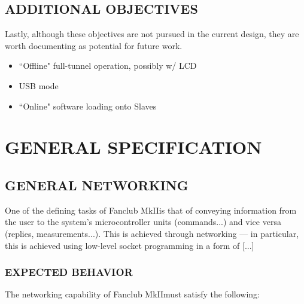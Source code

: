 \documentclass{article}
\newcommand{\Fc}{Fanclub MkII}
\begin{document}
\subsection{ADDITIONAL OBJECTIVES} %
\label{ssec:AObjs}
Lastly, although these objectives are not pursued in the current design, they are worth documenting as potential for future work.
\begin{itemize}
	\item ``Offline" full-tunnel operation, possibly w/ LCD
	
	\item USB mode
	
	\item ``Online" software loading onto Slaves
	
\end{itemize}

\pagebreak

\section{GENERAL SPECIFICATION}
\label{sec:Gspe}

\subsection{GENERAL NETWORKING} %
\label{sec:Gnet}

One of the defining tasks of \Fc\space is that of conveying information from the user to the system's microcontroller units (commands...) and vice versa (replies, measurements...). This is achieved through networking --- in particular, this is achieved using low-level socket programming in a form of [...]

\subsubsection{EXPECTED BEHAVIOR}
\label{sssec:ExpB}
The networking capability of \Fc\space must satisfy the following:
\end{document}

